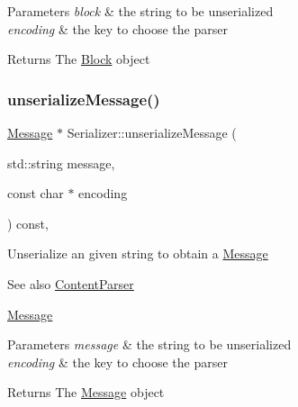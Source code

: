 \begin{DoxyParams}{Parameters}
{\em block} & the string to be unserialized \\
\hline
{\em encoding} & the key to choose the parser \\
\hline
\end{DoxyParams}
\begin{DoxyReturn}{Returns}
The \mbox{\hyperlink{classBlock}{Block}} object 
\end{DoxyReturn}
\mbox{\label{classSerializer_a1d16df9f35a7580da06a497dfbddffe8}} 
\subsubsection{\texorpdfstring{unserialize\+Message()}{unserializeMessage()}}
{\footnotesize\ttfamily \mbox{\hyperlink{classMessage}{Message}} $\ast$ Serializer\+::unserialize\+Message (\begin{DoxyParamCaption}\item[{std\+::string}]{message,  }\item[{const char $\ast$}]{encoding }\end{DoxyParamCaption}) const\hspace{0.3cm}{\ttfamily [virtual]}, {\ttfamily [inherited]}}

Unserialize an given string to obtain a \mbox{\hyperlink{classMessage}{Message}} \begin{DoxySeeAlso}{See also}
\mbox{\hyperlink{classContentParser}{Content\+Parser}} 

\mbox{\hyperlink{classMessage}{Message}}
\end{DoxySeeAlso}

\begin{DoxyParams}{Parameters}
{\em message} & the string to be unserialized \\
\hline
{\em encoding} & the key to choose the parser \\
\hline
\end{DoxyParams}
\begin{DoxyReturn}{Returns}
The \mbox{\hyperlink{classMessage}{Message}} object 
\end{DoxyReturn}
\mbox{\label{classSerializer_a64b858f0c2968e888cf796b6f09eed7b}} 
